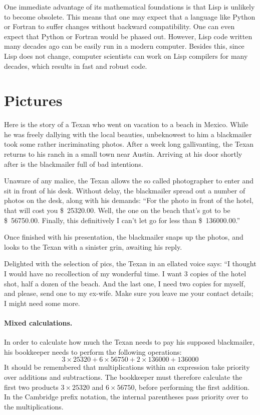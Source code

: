 \documentclass[a4paper,12pt]{book}
\begin{document}
One immediate advantage of its mathematical foundations is that
Lisp is unlikely to become obsolete. This means that one may
expect that a language like Python or Fortran to suffer changes
without backward compatibility. One can even expect that Python
or Fortran would be phased out. However, Lisp code written many
decades ago can be easily run in a modern computer. Besides this,
since Lisp does not change, computer scientists can work on Lisp
compilers for many decades, which results in fast and robust code.



\section{Pictures}
Here is the story of a Texan who went on
vacation to a beach in Mexico. While he was
freely dallying with the local beauties,
unbeknowest to him a blackmailer took some
rather incriminating photos.
After a week long gallivanting, the Texan
returns to his ranch in a small town near Austin.
Arriving at his door shortly after is the blackmailer
full of bad intentions.

Unaware of any malice, the Texan allows the so
called photographer to enter and sit in front
of his desk. Without delay, the blackmailer spread
out a number of photos on the desk, along with his
demands: “For the photo in front of the hotel,
that will cost you \$~25320.00. Well, the one
on the beach that's got to be \$~56750.00.
Finally, this definitively I can't let
go for less than \$~136000.00.”

Once finished with his presentation,
the blackmailer snaps up the photos,
and looks to the Texan with a sinister
grin, awaiting his reply.

Delighted with the selection of pics,
the Texan in an ellated voice says:
“I thought I would have no recollection
of my wonderful time. I want 3 copies
of the hotel shot, half a dozen of the beach.
And the last one, I need two copies for myself,
and please, send one to my ex-wife.
Make sure you leave me your contact
details; I might need some more.

\paragraph{Mixed calculations.}
In order to calculate how much the
Texan needs to pay his supposed blackmailer,
his bookkeeper needs to perform the
following operations:
$$3\times 25320+6\times 56750 + 2\times 136000+136000$$
It should be remembered that multiplications
within an expression take priority over additions
and subtractions. The bookkeeper must therefore
calculate the first two products $3\times 25320$
and $6\times 56750$, before performing the first
addition. In the Cambridge prefix notation,
the internal parentheses pass priority over
to the multiplications.
\end{document}
